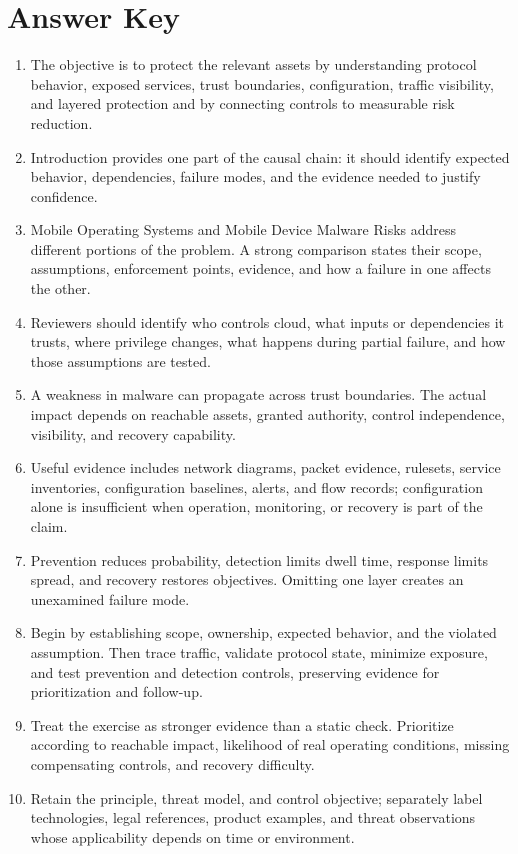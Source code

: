 \documentclass[11pt,letterpaper]{article}
\begin{document}
\section*{Answer Key}
\begin{enumerate}
\item The objective is to protect the relevant assets by understanding protocol behavior, exposed services, trust boundaries, configuration, traffic visibility, and layered protection and by connecting controls to measurable risk reduction.
\item Introduction provides one part of the causal chain: it should identify expected behavior, dependencies, failure modes, and the evidence needed to justify confidence.
\item Mobile Operating Systems and Mobile Device Malware Risks address different portions of the problem. A strong comparison states their scope, assumptions, enforcement points, evidence, and how a failure in one affects the other.
\item Reviewers should identify who controls cloud, what inputs or dependencies it trusts, where privilege changes, what happens during partial failure, and how those assumptions are tested.
\item A weakness in malware can propagate across trust boundaries. The actual impact depends on reachable assets, granted authority, control independence, visibility, and recovery capability.
\item Useful evidence includes network diagrams, packet evidence, rulesets, service inventories, configuration baselines, alerts, and flow records; configuration alone is insufficient when operation, monitoring, or recovery is part of the claim.
\item Prevention reduces probability, detection limits dwell time, response limits spread, and recovery restores objectives. Omitting one layer creates an unexamined failure mode.
\item Begin by establishing scope, ownership, expected behavior, and the violated assumption. Then trace traffic, validate protocol state, minimize exposure, and test prevention and detection controls, preserving evidence for prioritization and follow-up.
\item Treat the exercise as stronger evidence than a static check. Prioritize according to reachable impact, likelihood of real operating conditions, missing compensating controls, and recovery difficulty.
\item Retain the principle, threat model, and control objective; separately label technologies, legal references, product examples, and threat observations whose applicability depends on time or environment.
\end{enumerate}
\end{document}
